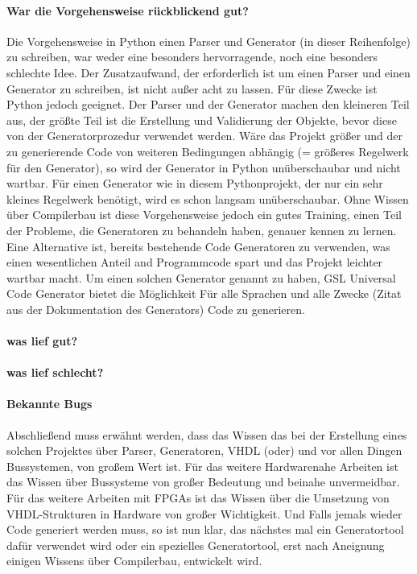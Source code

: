 \documentclass{article}
\begin{document}
\paragraph{War die Vorgehensweise rückblickend gut?}
Die Vorgehensweise in Python einen Parser und Generator (in dieser Reihenfolge) zu schreiben, war weder eine besonders hervorragende, noch eine besonders schlechte Idee. Der Zusatzaufwand, der erforderlich ist um einen Parser und einen Generator zu schreiben, ist nicht außer acht zu lassen. Für diese Zwecke ist Python jedoch geeignet. Der Parser und der Generator machen den kleineren Teil aus, der größte Teil ist die Erstellung und Validierung der Objekte, bevor diese von der Generatorprozedur verwendet werden. Wäre das Projekt größer und der zu generierende Code von weiteren Bedingungen abhängig (= größeres Regelwerk für den Generator), so wird der Generator in Python unüberschaubar und nicht wartbar. Für einen Generator wie in diesem Pythonprojekt, der nur ein sehr kleines Regelwerk benötigt, wird es schon langsam unüberschaubar. Ohne Wissen über Compilerbau ist diese Vorgehensweise jedoch ein gutes Training, einen Teil der Probleme, die Generatoren zu behandeln haben, genauer kennen zu lernen.
Eine Alternative ist, bereits bestehende Code Generatoren zu verwenden, was einen wesentlichen Anteil and Programmcode spart und das Projekt leichter wartbar macht. Um einen solchen Generator genannt zu haben, \glqq GSL Universal Code Generator \grqq bietet die Möglichkeit \glqq Für alle Sprachen und alle Zwecke \grqq (Zitat aus der Dokumentation des Generators) Code zu generieren.
\paragraph{was lief gut?}
\paragraph{was lief schlecht?}
\paragraph{Bekannte Bugs}

Abschließend muss erwähnt werden, dass das Wissen das bei der Erstellung eines solchen Projektes über Parser, Generatoren, VHDL (oder) und vor allen Dingen Bussystemen, von großem Wert ist. Für das weitere Hardwarenahe Arbeiten ist das Wissen über Bussysteme von großer Bedeutung und beinahe unvermeidbar. Für das weitere Arbeiten mit FPGAs ist das Wissen über die Umsetzung von VHDL-Strukturen in Hardware von großer Wichtigkeit. Und Falls jemals wieder Code generiert werden muss, so ist nun klar, das nächstes mal ein Generatortool dafür verwendet wird oder ein spezielles Generatortool, erst nach Aneignung einigen Wissens über Compilerbau, entwickelt wird.
\end{document}
